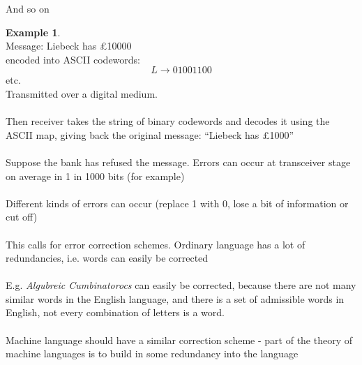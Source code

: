 \documentclass[]{article}
\theoremstyle{definition}
\newtheorem*{exmp}{Example}
\theoremstyle{remark}
\numberwithin{equation}{section}
\begin{document}
		And so on

		\begin{exmp}\hfill\\
		Message: Liebeck has £10000\\
		encoded into ASCII codewords:\\
		\[
		L \rightarrow 01001100
		\]
		etc.\\

		Transmitted over a digital medium.\\
		\\
		Then receiver takes the string of binary codewords and decodes it using the ASCII map, giving back the original message: “Liebeck has £1000”\\
		\\
		Suppose the bank has refused the message. Errors can occur at transceiver stage on average in 1 in 1000 bits (for example) \\
		\\
		Different kinds of errors can occur (replace 1 with 0, lose a bit of information or cut off) \\
		\\
		This calls for error correction schemes. Ordinary language has a lot of redundancies, i.e. words can easily be corrected \\
		\\
		E.g. \emph{Algubreic Cumbinatorocs} can easily be corrected, because there are not many similar words in the English language, and there is a set of admissible words in English, not every combination of letters is a word.\\
		\\
		Machine language should have a similar correction scheme - part of the theory of machine languages is to build in some redundancy into the language\\
		\end{exmp}
\end{document}

